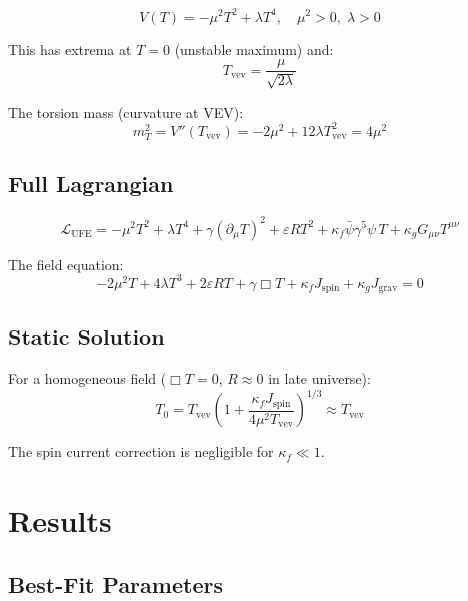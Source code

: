 \documentclass[twocolumn,prd,superscriptaddress,nofootinbib]{revtex4-2}
\begin{document}
\begin{equation}
\boxed{V(T) = -\mu^2 T^2 + \lambda T^4, \quad \mu^2 > 0,\; \lambda > 0}
\label{eq:mexican_hat}
\end{equation}

This has extrema at $T = 0$ (unstable maximum) and:
\begin{equation}
T_\text{vev} = \frac{\mu}{\sqrt{2\lambda}}
\label{eq:vev}
\end{equation}

The torsion mass (curvature at VEV):
\begin{equation}
m_T^2 = V''(T_\text{vev}) = -2\mu^2 + 12\lambda T_\text{vev}^2 = 4\mu^2
\end{equation}

\subsection{Full Lagrangian}

\begin{equation}
\mathcal{L}_\text{UFE} = -\mu^2 T^2 + \lambda T^4 + \gamma(\partial_\mu T)^2 + \varepsilon R T^2 + \kappa_f \bar{\psi}\gamma^5\psi\, T + \kappa_g G_{\mu\nu}T^{\mu\nu}
\end{equation}

The field equation:
\begin{equation}
\boxed{-2\mu^2 T + 4\lambda T^3 + 2\varepsilon R T + \gamma\Box T + \kappa_f J_\text{spin} + \kappa_g J_\text{grav} = 0}
\label{eq:field_eq}
\end{equation}

\subsection{Static Solution}

For a homogeneous field ($\Box T = 0$, $R \approx 0$ in late universe):
\begin{equation}
T_0 = T_\text{vev}\left(1 + \frac{\kappa_f J_\text{spin}}{4\mu^2 T_\text{vev}}\right)^{1/3} \approx T_\text{vev}
\end{equation}

The spin current correction is negligible for $\kappa_f \ll 1$.

\section{Results}

\subsection{Best-Fit Parameters}
\end{document}
